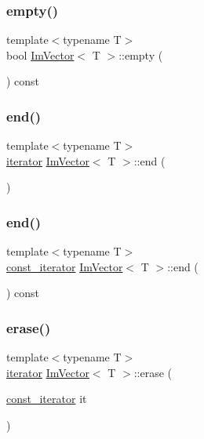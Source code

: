 \subsubsection{\texorpdfstring{empty()}{empty()}}
{\footnotesize\ttfamily template$<$typename T$>$ \\
bool \hyperlink{class_im_vector}{Im\+Vector}$<$ T $>$\+::empty (\begin{DoxyParamCaption}{ }\end{DoxyParamCaption}) const}

\hypertarget{class_im_vector_a947fbc3b1d8c1997e51ae6caab440379}{}\label{class_im_vector_a947fbc3b1d8c1997e51ae6caab440379} 
\subsubsection{\texorpdfstring{end()}{end()}\hspace{0.1cm}{\footnotesize\ttfamily [1/2]}}
{\footnotesize\ttfamily template$<$typename T$>$ \\
\hyperlink{class_im_vector_a74b5478f1f6fd471cc71219bce483db6}{iterator} \hyperlink{class_im_vector}{Im\+Vector}$<$ T $>$\+::end (\begin{DoxyParamCaption}{ }\end{DoxyParamCaption})}

\hypertarget{class_im_vector_a06efa87357864d1c130f0f400eeccf8d}{}\label{class_im_vector_a06efa87357864d1c130f0f400eeccf8d} 
\subsubsection{\texorpdfstring{end()}{end()}\hspace{0.1cm}{\footnotesize\ttfamily [2/2]}}
{\footnotesize\ttfamily template$<$typename T$>$ \\
\hyperlink{class_im_vector_aedeac9c5080f9d6ce96ae837768ee4c4}{const\+\_\+iterator} \hyperlink{class_im_vector}{Im\+Vector}$<$ T $>$\+::end (\begin{DoxyParamCaption}{ }\end{DoxyParamCaption}) const}

\hypertarget{class_im_vector_a1e1fd9b678be9d4b4432fbefde976045}{}\label{class_im_vector_a1e1fd9b678be9d4b4432fbefde976045} 
\subsubsection{\texorpdfstring{erase()}{erase()}}
{\footnotesize\ttfamily template$<$typename T$>$ \\
\hyperlink{class_im_vector_a74b5478f1f6fd471cc71219bce483db6}{iterator} \hyperlink{class_im_vector}{Im\+Vector}$<$ T $>$\+::erase (\begin{DoxyParamCaption}\item[{\hyperlink{class_im_vector_aedeac9c5080f9d6ce96ae837768ee4c4}{const\+\_\+iterator}}]{it }\end{DoxyParamCaption})}

